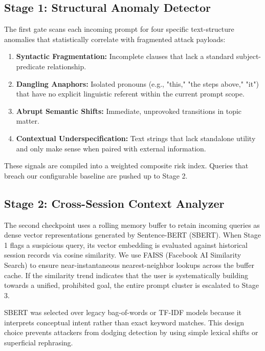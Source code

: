 \documentclass[conference]{IEEEtran}
\begin{document}
\subsection{\textbf{Stage 1: Structural Anomaly Detector}}

The first gate scans each incoming prompt for four specific text-structure anomalies that statistically correlate with fragmented attack payloads:

\begin{enumerate}
\item \textbf{Syntactic Fragmentation:} Incomplete clauses that lack a standard subject-predicate relationship.
\item \textbf{Dangling Anaphors:} Isolated pronouns (e.g., "this," "the steps above," "it") that have no explicit linguistic referent within the current prompt scope.
\item \textbf{Abrupt Semantic Shifts:} Immediate, unprovoked transitions in topic matter.
\item \textbf{Contextual Underspecification:} Text strings that lack standalone utility and only make sense when paired with external information.
\end{enumerate}

These signals are compiled into a weighted composite risk index. Queries that breach our configurable baseline are pushed up to Stage 2.

\subsection{\textbf{Stage 2: Cross-Session Context Analyzer}}

The second checkpoint uses a rolling memory buffer to retain incoming queries as dense vector representations generated by Sentence-BERT (SBERT). When Stage 1 flags a suspicious query, its vector embedding is evaluated against historical session records via cosine similarity. We use FAISS (Facebook AI Similarity Search) to ensure near-instantaneous nearest-neighbor lookups across the buffer cache. If the similarity trend indicates that the user is systematically building towards a unified, prohibited goal, the entire prompt cluster is escalated to Stage 3.

SBERT was selected over legacy bag-of-words or TF-IDF models because it interprets conceptual intent rather than exact keyword matches. This design choice prevents attackers from dodging detection by using simple lexical shifts or superficial rephrasing.
\end{document}
